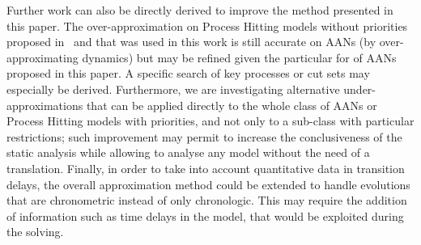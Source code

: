 
Further work can also be directly derived to improve the method presented in this paper.
The over-approximation on Process Hitting models without priorities proposed in~\cite{PMR12-MSCS}
and that was used in this work
is still accurate on AANs (by over-approximating dynamics)
but may be refined given the particular for of AANs proposed in this paper.
A specific search of key processes or cut sets \cite{PAK13-CAV} may especially be derived.
Furthermore, we are investigating alternative under-approximations that can be
applied directly to the whole class of AANs or Process Hitting models with priorities,
and not only to a sub-class with particular restrictions;
such improvement may permit to increase the conclusiveness of the static analysis
while allowing to analyse any model without the need of a translation.
Finally, in order to take into account quantitative data in transition delays, the overall approximation method could be extended to handle evolutions that are chronometric instead of only chronologic.
This may require the addition of information such as time delays in the model,
that would be exploited during the solving.
